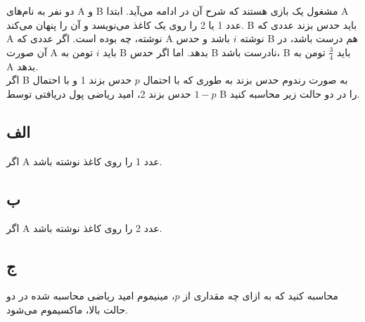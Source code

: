 دو نفر به نام‌های A و B مشغول یک بازی هستند که شرح آن در ادامه می‌آید. ابتدا A عدد 1 یا 2 را روی یک کاغذ می‌نویسد و آن را پنهان می‌کند. B باید حدس بزند عددی که A نوشته، چه بوده است. اگر عددی که A نوشته $i$ باشد و حدس B هم درست باشد، در آن صورت A باید $i$ تومن به B بدهد. اما اگر حدس B نادرست باشد، B باید $\frac{3}{4}$ تومن به A بدهد.\\
اگر B به صورت رندوم حدس بزند به طوری که با احتمال $p$ حدس بزند 1 و با احتمال $1-p$ حدس بزند 2، امید ریاضی پول دریافتی توسط B را در دو حالت زیر محاسبه کنید.

\subsection*{الف}
اگر A عدد 1 را روی کاغذ نوشته باشد.

\subsection*{ب}
اگر A عدد 2 را روی کاغذ نوشته باشد.

\subsection*{ج}
محاسبه کنید که به ازای چه مقداری از $p$، مینیموم امید ریاضی محاسبه شده در دو حالت بالا، ماکسیموم می‌شود.